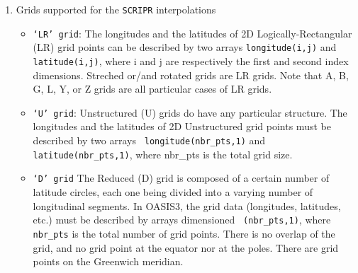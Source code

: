 \begin{enumerate}
%
%
%
%
%  

\item Grids supported for the {\tt SCRIPR} interpolations

\begin{itemize}

\item {\tt `LR' grid}: The longitudes and the latitudes of
  2D Logically-Rectangular (LR) grid points can be described by two arrays
  {\tt longitude(i,j)} and {\tt latitude(i,j)}, where i and j
  are respectively the first and second index dimensions. Streched
  or/and rotated grids are LR grids. Note that A, B, G, L, Y, or Z
  grids are all particular cases of LR grids.

\item {\tt `U' grid}: Unstructured (U) grids do have any particular
      structure. The longitudes and the latitudes of 2D Unstructured
      grid points must be described by two arrays {\tt
      longitude(nbr\_pts,1)} and {\tt latitude(nbr\_pts,1)}, where nbr\_pts
      is the total grid size.

\item {\tt `D' grid} The Reduced (D) grid is composed of a certain
number of latitude circles, each one being divided into a varying
number of longitudinal segments. In OASIS3, the grid data (longitudes,
latitudes, etc.) must be described by arrays dimensioned {\tt
(nbr\_pts,1)}, where {\tt nbr\_pts} is the total number of grid
points. There is no overlap of the grid, and no grid point at the
equator nor at the poles. There are grid points on the Greenwich
meridian.
 
\end{itemize}

\end{enumerate}



